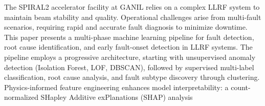 
The SPIRAL2 accelerator facility at GANIL relies on a complex LLRF system to maintain beam stability and quality. Operational challenges arise from multi-fault scenarios, requiring rapid and accurate fault diagnosis to minimize downtime. This paper presents a multi-phase machine learning pipeline for fault detection, root cause identification, and early fault-onset detection in LLRF systems. The pipeline employs a progressive architecture, starting with unsupervised anomaly detection (Isolation Forest, LOF, DBSCAN), followed by supervised multi-label classification, root cause analysis, and fault subtype discovery through clustering. Physics-informed feature engineering enhances model interpretability: a count-normalized SHapley Additive exPlanations (SHAP) analysis %
